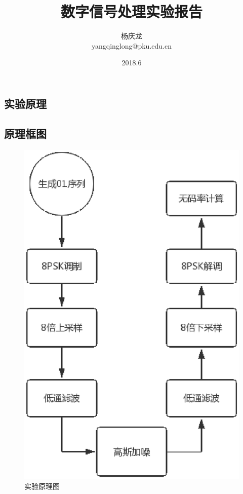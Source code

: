 \documentclass[UTF8]{article}
\begin{document}
\begin{CJK}{UTF8}{gkai}
\title{数字信号处理实验报告}
\author{杨庆龙\\yangqinglong@pku.edu.cn}
\date{2018.6}
\maketitle

\section{实验原理}
\subsection{原理框图}
\begin{figure}[H]
    \centering
    \includegraphics[scale=0.5]{block.eps}
    \caption{实验原理图}
    \label{blocks}
\end{figure}

\end{CJK}
\end{document}
